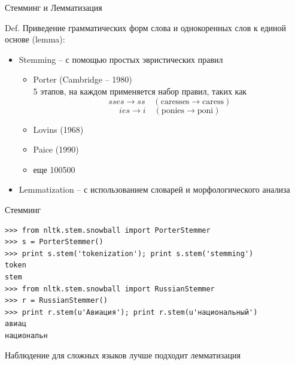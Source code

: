 \documentclass[aspectratio=169]{beamer}
\begin{document}

\begin{frame}{Стемминг и Лемматизация}

\begin{block}{Def.}
Приведение грамматических форм слова и однокоренных слов к единой основе (lemma): 
\begin{itemize}
\item Stemming -- с помощью простых эвристических правил
\begin{itemize}
\item Porter (Cambridge -- 1980) \\
5 этапов, на каждом применяется набор правил, таких как
\[
sses \rightarrow ss \quad (\text{caresses}\rightarrow\text{caress})
\]
\[
ies \rightarrow i \quad (\text{ponies}\rightarrow\text{poni})
\]
\item Lovins (1968)
\item Paice (1990)
\item еще 100500
\end{itemize}
\item Lemmatization -- с использованием словарей и морфологического анализа
\end{itemize}
\end{block}

\end{frame}


\begin{frame}[fragile]{Стемминг}

\begin{shaded}
{\color{green}
\begin{verbatim}
>>> from nltk.stem.snowball import PorterStemmer
>>> s = PorterStemmer()
>>> print s.stem('tokenization'); print s.stem('stemming')
token
stem
>>> from nltk.stem.snowball import RussianStemmer
>>> r = RussianStemmer()
>>> print r.stem(u'Авиация'); print r.stem(u'национальный')
авиац
национальн
\end{verbatim}
}
\end{shaded}

\begin{block}{Наблюдение}
для сложных языков лучше подходит лемматизация
\end{block}

\end{frame}

\end{document}
